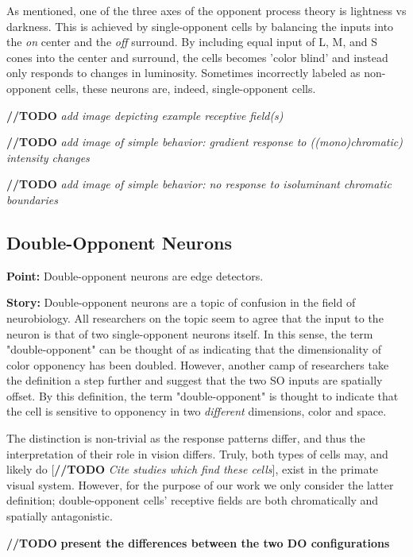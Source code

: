 \documentclass[journal,onecolumn]{IEEEtran}
\begin{document}
As mentioned, one of the three axes of the opponent process theory is lightness vs darkness. This is achieved by single-opponent cells by balancing the inputs into the \textit{on} center and the \textit{off} surround. By including equal input of L, M, and S cones into the center and surround, the cells becomes 'color blind' and instead only responds to changes in luminosity. Sometimes incorrectly labeled as non-opponent cells, these neurons are, indeed, single-opponent cells.

\bigskip

\textbf{//TODO} \textit{add image depicting example receptive field(s)}

\textbf{//TODO} \textit{add image of simple behavior: gradient response to ((mono)chromatic) intensity changes}

\textbf{//TODO} \textit{add image of simple behavior: no response to isoluminant chromatic boundaries}


\subsection*{Double-Opponent Neurons}

\textbf{Point:}
Double-opponent neurons are edge detectors. 

\textbf{Story:}
Double-opponent neurons are a topic of confusion in the field of neurobiology. All researchers on the topic seem to agree that the input to the neuron is that of two single-opponent neurons itself. In this sense, the term "double-opponent" can be thought of as indicating that the dimensionality of color opponency has been doubled. However, another camp of researchers take the definition a step further and suggest that the two SO inputs are spatially offset. By this definition, the term "double-opponent" is thought to indicate that the cell is sensitive to opponency in two \textit{different} dimensions, color and space.

The distinction is non-trivial as the response patterns differ, and thus the interpretation of their role in vision differs. Truly, both types of cells may, and likely do [\textbf{//TODO} \textit{Cite studies which find these cells}], exist in the primate visual system. However, for the purpose of our work we only consider the latter definition; double-opponent cells' receptive fields are both chromatically and spatially antagonistic.

\bigskip

\textbf{//TODO} \textbf{present the differences between the two DO configurations}
\end{document}
